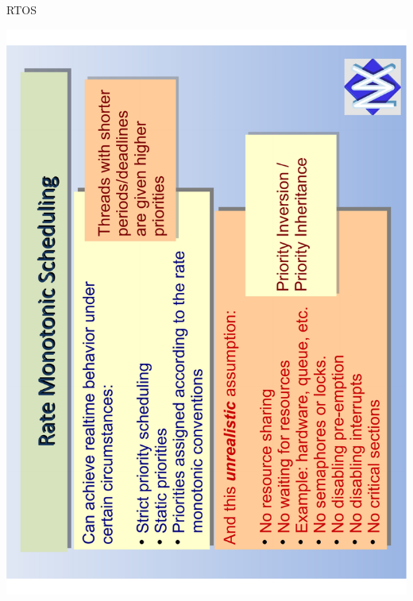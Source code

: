 \documentclass[aspectratio=169]{beamer}
\begin{document}
\begin{frame}{RTOS}
\begin{minipage}{0.5\textwidth}
\begin{overprint}
	\centering\includegraphics[angle=-90,origin=c,width=0.95\linewidth]{real.pdf}

\end{overprint}
\end{minipage}
\end{frame}
\end{document}
